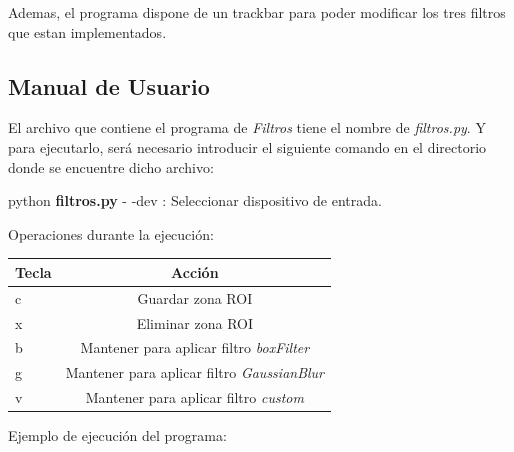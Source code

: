 \documentclass[a4paper]{article} %
\begin{document}
Ademas, el programa dispone de un trackbar para poder modificar los tres filtros que estan implementados.

\subsection*{Manual de Usuario}

El archivo que contiene el programa de \textit{Filtros} tiene el nombre de \textit{filtros.py}. Y para ejecutarlo, será necesario introducir el siguiente comando en el directorio donde se encuentre dicho archivo:
\\
\begin{tcolorbox}[collower=red!75!black]
python \textbf{filtros.py}
\tcblower
- -dev : Seleccionar dispositivo de entrada.
\end{tcolorbox}

Operaciones durante la ejecución:

\begin{center}
    \begin{tabular}{ l | c }
      Tecla & Acción \\ \hline
      c & Guardar zona ROI \\
      x & Eliminar zona ROI \\
      b & Mantener para aplicar filtro \textit{boxFilter} \\
      g & Mantener para aplicar filtro \textit{GaussianBlur} \\
      v & Mantener para aplicar filtro \textit{custom} \\
    \end{tabular}
\end{center}

Ejemplo de ejecución del programa:
\end{document}
